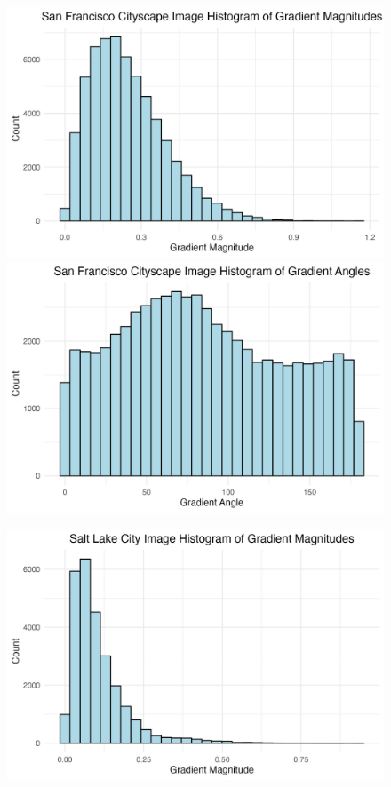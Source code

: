 \documentclass[
  letterpaper,
  DIV=11,
  numbers=noendperiod]{scrreprt}
\begin{document}
\begin{figure}

\begin{minipage}{0.33\linewidth}
\includegraphics{images/plots/aerial_cities/sf_histogram_mag_plot.jpg}
\includegraphics{images/plots/aerial_cities/sf_histogram_theta_plot.jpg}\end{minipage}%
%
\begin{minipage}{0.33\linewidth}
\includegraphics{images/plots/aerial_cities/salt_lake_histogram_mag_plot.jpg}

\end{minipage}
\end{figure}
\end{document}

